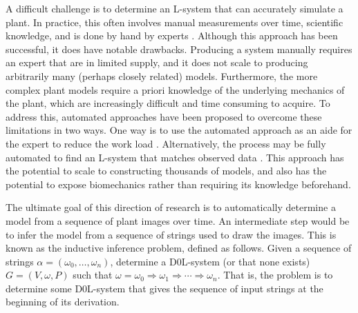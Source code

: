 \documentclass{llncs}
\begin{document}
	A difficult challenge is to determine an L-system that can accurately simulate a plant. In practice, this often involves manual measurements over time, scientific knowledge, and is done by hand by experts \cite{beauty}. Although this approach has been successful, it does have notable drawbacks. Producing a system manually requires an expert that are in limited supply, and it does not scale to producing arbitrarily many (perhaps closely related) models. Furthermore, the more complex plant models require a priori knowledge of the underlying mechanics of the plant, which are increasingly difficult and time consuming to acquire. To address this, automated approaches have been proposed to overcome these limitations in two ways. One way is to use the automated approach as an aide for the expert to reduce the work load \cite{jacob_inferflowers,mock_wildwood}. Alternatively, the process may be fully automated to find an L-system that matches observed data \cite{nakano_inferD0Lerrorfree, runqiang_inferGA}. This approach has the potential to scale to constructing thousands of models, and also has the potential to expose biomechanics rather than requiring its knowledge beforehand.
	
	The ultimate goal of this direction of research is to automatically determine a model from a sequence of plant images over time. An intermediate step would be to infer the model from a sequence of strings used to draw the images. This is known as the inductive inference problem, defined as follows. Given a sequence of strings $\alpha = (\omega_{0}, \ldots, \omega_{n})$, determine a D0L-system (or that none exists) $G = (V,\omega, P)$ such that $\omega = \omega_{0} \Rightarrow \omega_{1} \Rightarrow \cdots \Rightarrow \omega_{n}$. That is, the problem is to determine some D0L-system that gives the sequence of input strings at the beginning of its derivation.
	
\end{document}
